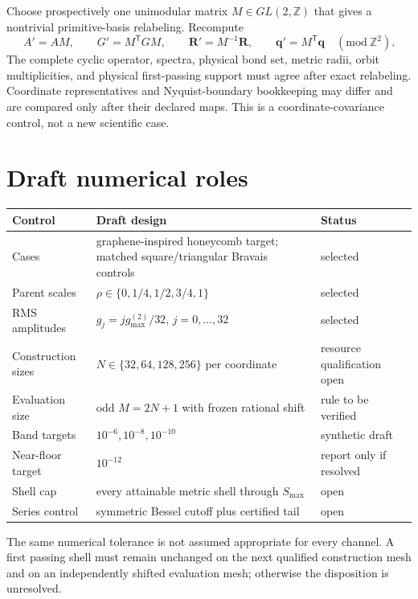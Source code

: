 \documentclass[11pt]{article}
\newcommand{\Z}{\mathbb Z}
\begin{document}
Choose prospectively one unimodular matrix $M\in GL(2,\Z)$ that gives a nontrivial
primitive-basis relabeling.  Recompute
\begin{equation}
 A'=AM,
 \qquad G'=M^{\mathsf T}GM,
 \qquad \mathbf R'=M^{-1}\mathbf R,
 \qquad \mathbf q'=M^{\mathsf T}\mathbf q
 \quad (\mathrm{mod}\ \Z^2).
\end{equation}
The complete cyclic operator, spectra, physical bond set, metric radii, orbit
multiplicities, and physical first-passing support must agree after exact relabeling.
Coordinate representatives and Nyquist-boundary bookkeeping may differ and are compared
only after their declared maps.  This is a coordinate-covariance control, not a new
scientific case.

\section{Draft numerical roles}

\begin{table}[htbp]
\centering
\begin{tabular}{p{}p{}p{}}
\toprule
Control & Draft design & Status\\
\midrule
Cases & graphene-inspired honeycomb target; matched square/triangular Bravais controls & selected\\
Parent scales & $\rho\in\{0,1/4,1/2,3/4,1\}$ & selected\\
RMS amplitudes & $g_j=jg_{\max}^{(2)}/32$, $j=0,\ldots,32$ & selected\\
Construction sizes & $N\in\{32,64,128,256\}$ per coordinate & resource qualification open\\
Evaluation size & odd $M=2N+1$ with frozen rational shift & rule to be verified\\
Band targets & $10^{-6},10^{-8},10^{-10}$ & synthetic draft\\
Near-floor target & $10^{-12}$ & report only if resolved\\
Shell cap & every attainable metric shell through $S_{\max}$ & open\\
Series control & symmetric Bessel cutoff plus certified tail & open\\
\bottomrule
\end{tabular}
\end{table}

The same numerical tolerance is not assumed appropriate for every channel.  A first
passing shell must remain unchanged on the next qualified construction mesh and on an
independently shifted evaluation mesh; otherwise the disposition is unresolved.
\end{document}
